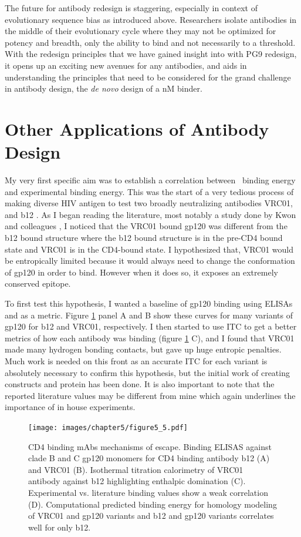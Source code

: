 The future for antibody redesign is staggering, especially in context of evolutionary sequence bias as introduced above. Researchers isolate antibodies in the middle of their evolutionary cycle where they may not be optimized for potency and breadth, only the ability to bind and not necessarily to a threshold. With the redesign principles that we have gained insight into with PG9 redesign, it opens up an exciting new avenues for any antibodies, and aids in understanding the principles that need to be considered for the grand challenge in antibody design, the \textit{de novo} design of a nM binder.

\section{Other Applications of Antibody Design}
My very first specific aim was to establish a correlation between \silico~binding energy and experimental binding energy. This was the start of a very tedious process of making diverse HIV antigen to test two broadly neutralizing antibodies VRC01, and b12 \citep{Wu:2009ks,Li:2011ea}. As I began reading the literature, most notably a study done by Kwon and colleagues \citep{Kwon:2012eo}, I noticed that the VRC01 bound gp120 was different from the b12 bound structure where the b12 bound structure is in the pre-CD4 bound state and VRC01 is in the CD4-bound state. I hypothesized that, VRC01 would be entropically limited because it would always need to change the conformation of gp120 in order to bind. However when it does so, it exposes an extremely conserved epitope.

To first test this hypothesis, I wanted a baseline of gp120 binding using ELISAs and \ec as a metric. Figure \ref{fig:fig5_5} panel A and B show these curves for many variants of gp120 for b12 and VRC01, respectively. I then started to use ITC to get a better metrics of how each antibody was binding (figure \ref{fig:fig5_5} C), and I found that VRC01 made many hydrogen bonding contacts, but gave up huge entropic penalties. Much work is needed on this front as an accurate ITC for each variant is absolutely necessary to confirm this hypothesis, but the initial work of creating constructs and protein has been done. It is also important to note that the reported literature values may be different from mine which again underlines the importance of in house experiments.

\begin{figure}[!t]
   \centering
   \texttt{[image: images/chapter5/figure5\_5.pdf]}
   \caption[CD4 Binding mAbs Mechanisms of Escape]{CD4 binding mAbs mechanisms of escape. Binding ELISAS against clade B and C gp120 monomers for CD4 binding antibody b12 (A) and VRC01 (B). Isothermal titration calorimetry of VRC01 antibody against b12 highlighting enthalpic domination (C). Experimental vs. literature binding values show a weak correlation (D). Computational predicted binding energy for homology modeling of VRC01 and gp120 variants and b12 and gp120 variants correlates well for only b12.}
    \label{fig:fig5_5}
\end{figure}

